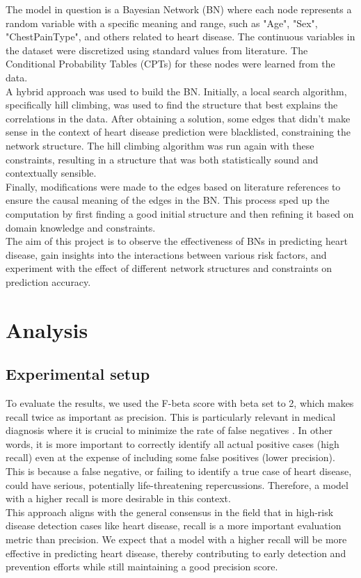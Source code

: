 \documentclass[letterpaper]{article}
\begin{document}
The model in question is a Bayesian Network (BN) where each node represents a random variable with a specific meaning and range, such as "Age", "Sex", "ChestPainType", and others related to heart disease. The continuous variables in the dataset were discretized using standard values from literature. The Conditional Probability Tables (CPTs) for these nodes were learned from the data.\\
A hybrid approach was used to build the BN. Initially, a local search algorithm, specifically hill climbing, was used to find the structure that best explains the correlations in the data. After obtaining a solution, some edges that didn't make sense in the context of heart disease prediction were blacklisted, constraining the network structure. The hill climbing algorithm was run again with these constraints, resulting in a structure that was both statistically sound and contextually sensible.\\
Finally, modifications were made to the edges based on literature references to ensure the causal meaning of the edges in the BN. This process sped up the computation by first finding a good initial structure and then refining it based on domain knowledge and constraints.\\
The aim of this project is to observe the effectiveness of BNs in predicting heart disease, gain insights into the interactions between various risk factors, and experiment with the effect of different network structures and constraints on prediction accuracy.

\section{Analysis}

\subsection{Experimental setup}
To evaluate the results, we used the F-beta score with beta set to 2, which makes recall twice as important as precision. This is particularly relevant in medical diagnosis where it is crucial to minimize the rate of false negatives \cite{9418099}. In other words, it is more important to correctly identify all actual positive cases (high recall) even at the expense of including some false positives (lower precision). This is because a false negative, or failing to identify a true case of heart disease, could have serious, potentially life-threatening repercussions. Therefore, a model with a higher recall is more desirable in this context.\\
This approach aligns with the general consensus in the field that in high-risk disease detection cases like heart disease, recall is a more important evaluation metric than precision. We expect that a model with a higher recall will be more effective in predicting heart disease, thereby contributing to early detection and prevention efforts while still maintaining a good precision score.
\end{document}
